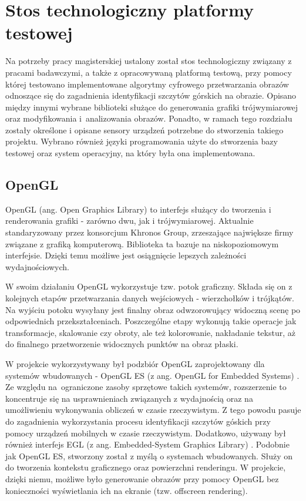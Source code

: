 \newpage

\section{Stos technologiczny platformy testowej}

Na potrzeby pracy magisterskiej ustalony został stos technologiczny związany z pracami badawczymi, a także z opracowywaną platformą testową, przy pomocy której testowano implementowane algorytmy cyfrowego przetwarzania obrazów odnoszące się do zagadnienia identyfikacji szczytów górskich na obrazie. Opisano między innymi wybrane biblioteki służące do generowania grafiki trójwymiarowej oraz modyfikowania i~analizowania obrazów. Ponadto, w ramach tego rozdziału zostały określone i opisane sensory urządzeń potrzebne do stworzenia takiego projektu. Wybrano również języki programowania użyte do stworzenia bazy testowej oraz system operacyjny, na który była ona implementowana. 


\subsection{OpenGL}

OpenGL (ang. Open Graphics Library) \cite{opengl_home} to interfejs służący do tworzenia i renderowania grafiki - zarówno dwu, jak i trójwymiarowej. Aktualnie standaryzowany przez konsorcjum Khronos Group, zrzeszające największe firmy związane z grafiką komputerową. Biblioteka ta bazuje na niskopoziomowym interfejsie. Dzięki temu możliwe jest osiągnięcie lepszych zależności wydajnościowych.

W swoim działaniu OpenGL wykorzystuje tzw. potok graficzny. Składa się on z kolejnych etapów przetwarzania danych wejściowych - wierzchołków i trójkątów. Na wyjściu potoku wysyłany jest finalny obraz odwzorowujący widoczną scenę po odpowiednich przekształceniach. Poszczególne etapy wykonują takie operacje jak transformacje, skalowanie czy obroty, ale też kolorowanie, nakładanie tekstur, aż do finalnego przetworzenie widocznych punktów na obraz płaski.


W projekcie wykorzystywany był podzbiór OpenGL zaprojektowany dla systemów wbudowanych - OpenGL ES (z ang. OpenGL for Embedded Systems) \cite{opengl_es}. Ze względu na~ograniczone zasoby sprzętowe takich systemów, rozszerzenie to koncentruje się na usprawnieniach związanych z wydajnością oraz na umożliwieniu wykonywania obliczeń w czasie rzeczywistym. Z tego powodu pasuje do zagadnienia wykorzystania procesu identyfikacji szczytów góskich przy pomocy urządzeń mobilnych w czasie rzeczywistym. Dodatkowo, używany był również interfejs EGL (z ang. Embedded-System Graphics Library) \cite{egl}. Podobnie jak OpenGL ES, stworzony został z myślą o systemach wbudowanych. Służy on do tworzenia kontekstu graficznego oraz powierzchni renderingu. W projekcie, dzięki niemu, możliwe było generowanie obrazów przy pomocy OpenGL bez konieczności wyświetlania ich na ekranie (tzw. offscreen rendering).

